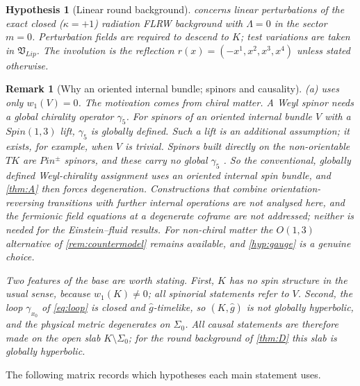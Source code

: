 \documentclass[11pt]{article}
\theoremstyle{canonmath}
\newtheorem{remark}[theorem]{Remark}
\theoremstyle{canonpostulate}
\theoremstyle{canonproposition}
\theoremstyle{canonmath}
\theoremstyle{canonproposition}
\newtheorem{hypothesis}{Hypothesis}
\providecommand{\Vb}{\mathcal{V}}
\providecommand{\Vlip}{\mathfrak{V}_{\mathrm{Lip}}}
\providecommand{\Klein}{\mathcal{K}}
\def\mathrm#1{#1}%
\def\mathcal#1{#1}%
\begin{document}
\begin{hypothesis}[Linear round background]\label{hyp:linear}
 concerns linear perturbations of the exact closed ($\kappa=+1$) radiation FLRW background with $\Lambda = 0$ in the sector $m = 0$. Perturbation fields are required to descend to $\Klein$; test variations are taken in $\Vlip$. The involution is the reflection $r(x) = (-x^1, x^2, x^3, x^4)$ unless stated otherwise.
\end{hypothesis}

\begin{remark}[Why an oriented internal bundle; spinors and causality]\label{rem:chiral}
(a) uses only $w_1(\Vb) = 0$. The motivation comes from chiral matter. A Weyl spinor needs a global chirality operator $\gamma_5$. For spinors of an oriented internal bundle $\Vb$ with a $\mathrm{Spin}(1,3)$ lift, $\gamma_5$ is globally defined. Such a lift is an additional assumption; it exists, for example, when $\Vb$ is trivial. Spinors built directly on the non-orientable $T\Klein$ are $\mathrm{Pin}^\pm$ spinors, and these carry no global $\gamma_5$ \cite{Berg2001,Witten2016}. So the conventional, globally defined Weyl-chirality assignment uses an oriented internal spin bundle, and \cref{thm:A} then forces degeneration. Constructions that combine orientation-reversing transitions with further internal operations are not analysed here, and the fermionic field equations at a degenerate coframe are not addressed; neither is needed for the Einstein--fluid results. For non-chiral matter the $\mathrm{O}(1,3)$ alternative of \cref{rem:countermodel} remains available, and \ref{hyp:gauge} is a genuine choice.

Two features of the base are worth stating. First, $\Klein$ has no spin structure in the usual sense, because $w_1(\Klein)\neq0$; all spinorial statements refer to $\Vb$. Second, the loop $\gamma_{x_0}$ of \eqref{eq:loop} is closed and $\hat g$-timelike, so $(\Klein,\hat g)$ is not globally hyperbolic, and the physical metric degenerates on $\Sigma_0$. All causal statements are therefore made on the open slab $\Klein\setminus\Sigma_0$; for the round background of \cref{thm:D} this slab is globally hyperbolic.
\end{remark}

The following matrix records which hypotheses each main statement uses.
\end{document}
